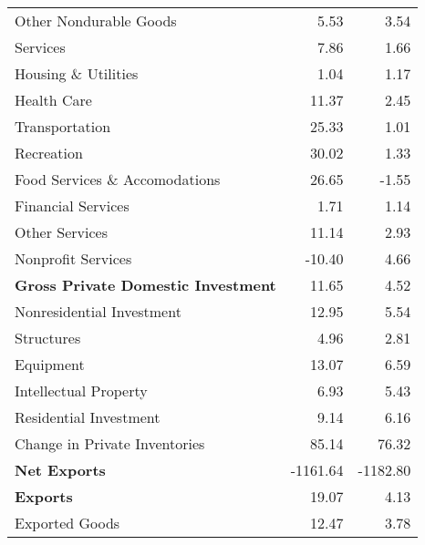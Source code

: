 \documentclass[11pt, letterpaper]{article}\usepackage[]{graphicx}\usepackage[]{color}
\begin{document}
\begin{table}[H]
\begin{tabular}{lrr}
  \hspace{24mm}  Other Nondurable Goods & 5.53 & 3.54 \\ 
  \hspace{8mm}  Services & 7.86 & 1.66 \\ 
  \hspace{16mm}  Housing \& Utilities & 1.04 & 1.17 \\ 
  \hspace{16mm}  Health Care & 11.37 & 2.45 \\ 
  \hspace{16mm}  Transportation & 25.33 & 1.01 \\ 
  \hspace{16mm}  Recreation & 30.02 & 1.33 \\ 
  \hspace{16mm}  Food Services \& Accomodations & 26.65 & -1.55 \\ 
  \hspace{16mm}  Financial Services & 1.71 & 1.14 \\ 
  \hspace{16mm}  Other Services & 11.14 & 2.93 \\ 
  \hspace{16mm}  Nonprofit Services & -10.40 & 4.66 \\ 
  \hspace{0mm} \textbf{Gross Private Domestic Investment} & 11.65 & 4.52 \\ 
  \hspace{8mm}  Nonresidential Investment & 12.95 & 5.54 \\ 
  \hspace{16mm}  Structures & 4.96 & 2.81 \\ 
  \hspace{16mm}  Equipment & 13.07 & 6.59 \\ 
  \hspace{16mm}  Intellectual Property & 6.93 & 5.43 \\ 
  \hspace{8mm}  Residential Investment & 9.14 & 6.16 \\ 
  \hspace{8mm}  Change in Private Inventories & 85.14 & 76.32 \\ 
  \hspace{0mm} \textbf{Net Exports} & -1161.64 & -1182.80 \\ 
  \hspace{0mm} \textbf{Exports} & 19.07 & 4.13 \\ 
  \hspace{8mm}  Exported Goods & 12.47 & 3.78 \\ 

\end{tabular}
\end{table}
\end{document}
